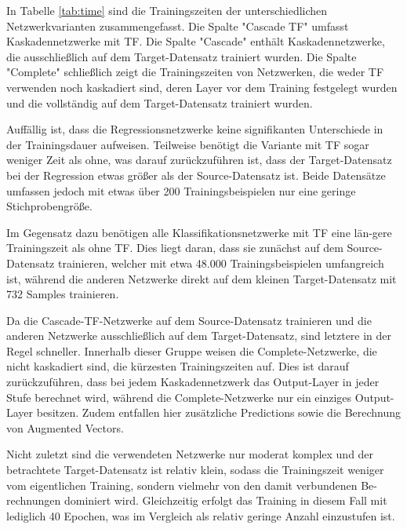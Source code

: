 In Tabelle \ref{tab:time} sind die Trainingszeiten der unterschiedlichen Netzwerkvarianten zusammengefasst. Die Spalte "Cascade TF" umfasst 
Kaskadennetzwerke mit TF. Die Spalte "Cascade" enthält Kaskadennetzwerke, die ausschließlich auf dem Target-Datensatz 
trainiert wurden. Die Spalte "Complete" schließlich zeigt die Trainingszeiten von Netzwerken, die weder TF verwenden noch kaskadiert sind, deren 
Layer vor dem Training festgelegt wurden und die vollständig auf dem Target-Datensatz trainiert wurden.

Auffällig ist, dass die Regressionsnetzwerke keine signifikanten Unterschiede in der Trainingsdauer aufweisen. Teilweise benötigt die Variante 
mit TF sogar weniger Zeit als ohne, was darauf zurückzuführen ist, dass der Target-Datensatz bei der Regression etwas größer als der 
Source-Datensatz ist. Beide Datensätze umfassen jedoch mit etwas über 200 Trainingsbeispielen nur eine geringe Stichprobengröße.

Im Gegensatz dazu benötigen alle Klassifikationsnetzwerke mit TF eine län-gere Trainingszeit als ohne TF. Dies liegt daran, dass sie zunächst auf 
dem Source-Datensatz trainieren, welcher mit etwa 48.000 Trainingsbeispielen umfangreich ist, während die anderen Netzwerke direkt auf dem 
kleinen Target-Datensatz mit 732 Samples trainieren.

Da die Cascade-TF-Netzwerke auf dem Source-Datensatz trainieren und die anderen Netzwerke ausschließlich auf dem Target-Datensatz, sind letztere 
in der Regel schneller. Innerhalb dieser Gruppe weisen die Complete-Netzwerke, die nicht kaskadiert sind, die kürzesten Trainingszeiten auf. Dies 
ist darauf zurückzuführen, dass bei jedem Kaskadennetzwerk das Output-Layer in jeder Stufe berechnet wird, während die Complete-Netzwerke nur ein 
einziges Output-Layer besitzen. Zudem entfallen hier zusätzliche Predictions sowie die Berechnung von Augmented Vectors.

Nicht zuletzt sind die verwendeten Netzwerke nur moderat komplex und der betrachtete Target-Datensatz ist relativ klein, sodass die Trainingszeit 
weniger vom eigentlichen Training, sondern vielmehr von den damit verbundenen Be-rechnungen dominiert wird. 
Gleichzeitig erfolgt das Training in diesem Fall mit lediglich 40 Epochen, was im Vergleich als relativ geringe Anzahl einzustufen ist. 

